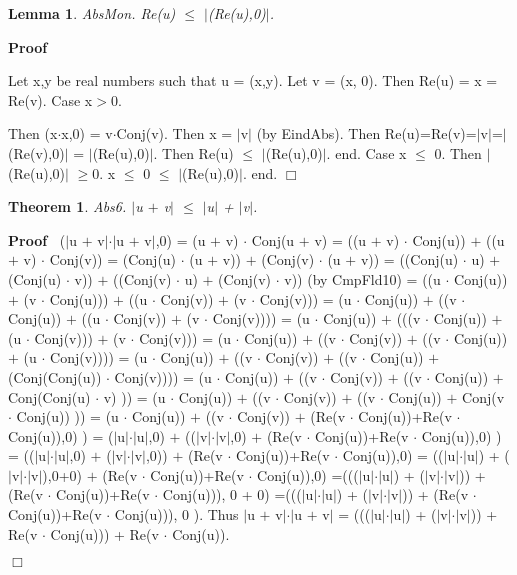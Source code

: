 \documentclass{article}
\newenvironment{forthel}{\begin{leftbar}}{\end{leftbar}}
\newenvironment{proof}{\noindent\textbf{Proof\ }}{\hspace*{\fill}$\Box$\medskip}
\newtheorem{lemma}{Lemma}
\newtheorem{theorem}{Theorem}
\newcommand{\cmul}{\cdot}
\newcommand{\cadd}{+}
\begin{document}
\begin{forthel}
\begin{lemma} AbsMon. Re(u) $\leq$ $|$(Re(u),0)$|$.

\end{lemma}
\begin{proof}

Let x,y be real numbers such that u = (x,y).
Let v = (x, 0).
Then Re(u) = x = Re(v).
Case x$>$0.

Then (x$\cdot$x,0) = v$\cmul$Conj(v).
Then x = $|$v$|$ (by EindAbs).
Then Re(u)=Re(v)=$|$v$|$=$|$(Re(v),0)$|$ = $|$(Re(u),0)$|$.
Then Re(u) $\leq$ $|$(Re(u),0)$|$.
end.
Case x $\leq$ 0.
Then $|$(Re(u),0)$|$ $\geq$0.
x $\leq$ 0 $\leq$ $|$(Re(u),0)$|$.
end.
\end{proof}


\begin{theorem}
 Abs6. $|$u $\cadd$ v$|$ $\leq$ $|$u$|$ + $|$v$|$.
\end{theorem}\begin{proof}
 ($|$u $\cadd$ v$|$$\cdot$$|$u $\cadd$ v$|$,0)	= (u $\cadd$ v) $\cmul$ Conj(u $\cadd$ v)
=  ((u $\cadd$ v) $\cmul$ Conj(u)) $\cadd$ ((u $\cadd$ v) $\cmul$ Conj(v)) 
=  (Conj(u) $\cmul$ (u $\cadd$ v)) $\cadd$ (Conj(v) $\cmul$ (u $\cadd$ v)) 
=  ((Conj(u) $\cmul$ u) $\cadd$ (Conj(u) $\cmul$ v)) $\cadd$ ((Conj(v) $\cmul$ u) $\cadd$ (Conj(v) $\cmul$ v)) (by CmpFld10)
=  ((u $\cmul$ Conj(u)) $\cadd$ (v $\cmul$ Conj(u))) $\cadd$ ((u $\cmul$ Conj(v)) $\cadd$ (v $\cmul$ Conj(v)))
=  (u $\cmul$ Conj(u)) $\cadd$ ((v $\cmul$ Conj(u)) $\cadd$ ((u $\cmul$ Conj(v)) $\cadd$ (v $\cmul$ Conj(v))))
=  (u $\cmul$ Conj(u)) $\cadd$ (((v $\cmul$ Conj(u)) $\cadd$ (u $\cmul$ Conj(v))) $\cadd$ (v $\cmul$ Conj(v)))
=  (u $\cmul$ Conj(u)) $\cadd$ ((v $\cmul$ Conj(v)) $\cadd$ ((v $\cmul$ Conj(u)) $\cadd$ (u $\cmul$ Conj(v)))) 
=  (u $\cmul$ Conj(u)) $\cadd$ ((v $\cmul$ Conj(v)) $\cadd$ ((v $\cmul$ Conj(u)) $\cadd$ (Conj(Conj(u)) $\cmul$ Conj(v))))
=  (u $\cmul$ Conj(u)) $\cadd$ ((v $\cmul$ Conj(v)) $\cadd$ ((v $\cmul$ Conj(u)) $\cadd$ Conj(Conj(u) $\cmul$ v) ))
=  (u $\cmul$ Conj(u)) $\cadd$ ((v $\cmul$ Conj(v)) $\cadd$ ((v $\cmul$ Conj(u)) $\cadd$ Conj(v $\cmul$ Conj(u)) ))
=  (u $\cmul$ Conj(u)) $\cadd$ ((v $\cmul$ Conj(v)) $\cadd$ (Re(v $\cmul$ Conj(u))+Re(v $\cmul$ Conj(u)),0) )
=  ($|$u$|$$\cdot$$|$u$|$,0) $\cadd$ (($|$v$|$$\cdot$$|$v$|$,0) $\cadd$ (Re(v $\cmul$ Conj(u))+Re(v $\cmul$ Conj(u)),0) )
=  (($|$u$|$$\cdot$$|$u$|$,0) $\cadd$ ($|$v$|$$\cdot$$|$v$|$,0)) $\cadd$ (Re(v $\cmul$ Conj(u))+Re(v $\cmul$ Conj(u)),0)
= (($|$u$|$$\cdot$$|$u$|$) + ($|$v$|$$\cdot$$|$v$|$),0+0) $\cadd$ (Re(v $\cmul$ Conj(u))+Re(v $\cmul$ Conj(u)),0)
=((($|$u$|$$\cdot$$|$u$|$) + ($|$v$|$$\cdot$$|$v$|$)) + (Re(v $\cmul$ Conj(u))+Re(v $\cmul$ Conj(u))), 0 + 0)
=((($|$u$|$$\cdot$$|$u$|$) + ($|$v$|$$\cdot$$|$v$|$)) + (Re(v $\cmul$ Conj(u))+Re(v $\cmul$ Conj(u))), 0 ).
Thus $|$u $\cadd$ v$|$$\cdot$$|$u $\cadd$ v$|$ = ((($|$u$|$$\cdot$$|$u$|$) + ($|$v$|$$\cdot$$|$v$|$)) + Re(v $\cmul$ Conj(u))) + Re(v $\cmul$ Conj(u)).



\end{proof}
\end{forthel}
\end{document}
